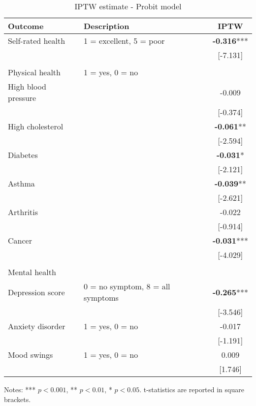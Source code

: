 \begin{table}[h!]
    \centering
    \caption{IPTW estimate - Probit model}
    \label{app:iptw_probit}
    \begin{threeparttable}
        \begin{tabular}{llc}
            \toprule
            Outcome & Description & IPTW \\
            \midrule
            Self-rated health & 1 = excellent, 5 = poor & \textbf{-0.316}*** \\
            & & [-7.131] \\
            & & \\
            Physical health & 1 = yes, 0 = no & \\
            High blood pressure &  & -0.009 \\
            &  & [-0.374] \\
            High cholesterol &  & \textbf{-0.061}** \\
            &  & [-2.594] \\
            Diabetes &  & \textbf{-0.031}* \\
            &  & [-2.121] \\
            Asthma &  & \textbf{-0.039}** \\
            &  & [-2.621] \\
            Arthritis &  & -0.022 \\
            &  & [-0.914] \\
            Cancer &  & \textbf{-0.031}*** \\
            &  & [-4.029] \\
            & & \\
            Mental health & & \\
            Depression score & 0 = no symptom, 8 = all symptoms & \textbf{-0.265}*** \\
            & & [-3.546] \\
            Anxiety disorder & 1 = yes, 0 = no  & -0.017 \\
            &  & [-1.191] \\
            Mood swings & 1 = yes, 0 = no  & 0.009 \\
            &  & [1.746] \\
            \bottomrule
        \end{tabular}
        \begin{tablenotes}
            \footnotesize
            \item Notes: *** $p < 0.001$, ** $p < 0.01$, * $p < 0.05$. t-statistics are reported in square brackets.
        \end{tablenotes}
    \end{threeparttable}
\end{table}

